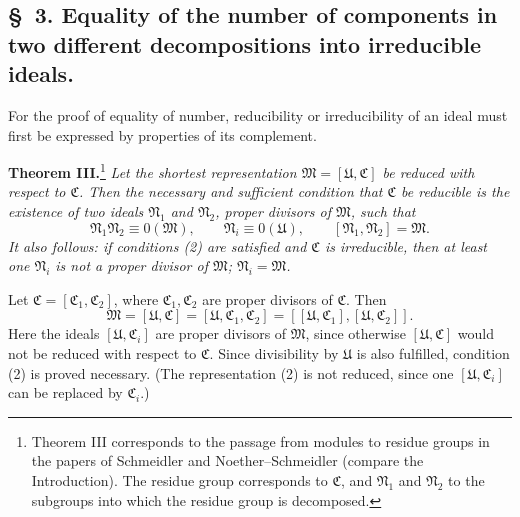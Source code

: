 \documentclass[11pt]{article}
\newcommand{\ideal}[1]{\mathfrak{#1}}
\begin{document}
\subsection*{\S~3. Equality of the number of components in two different decompositions into irreducible ideals.}

For the proof of equality of number, reducibility or irreducibility of an ideal must first be expressed by properties of its complement.

\textbf{Theorem III.}\footnote{Theorem III corresponds to the passage from modules to residue groups in the papers of Schmeidler and Noether--Schmeidler (compare the Introduction). The residue group corresponds to $\ideal C$, and $\ideal N_1$ and $\ideal N_2$ to the subgroups into which the residue group is decomposed.} \emph{Let the shortest representation $\ideal M=[\ideal U,\ideal C]$ be reduced with respect to $\ideal C$. Then the necessary and sufficient condition that $\ideal C$ be reducible is the existence of two ideals $\ideal N_1$ and $\ideal N_2$, proper divisors of $\ideal M$, such that}
\begin{equation}
 \ideal N_1\ideal N_2\equiv0(\ideal M),\qquad
 \ideal N_i\equiv0(\ideal U),\qquad
 [\ideal N_1,\ideal N_2]=\ideal M.
\tag{2}
\end{equation}
\emph{It also follows: if conditions (2) are satisfied and $\ideal C$ is irreducible, then at least one $\ideal N_i$ is not a proper divisor of $\ideal M$; $\ideal N_i=\ideal M$.}

Let $\ideal C=[\ideal C_1,\ideal C_2]$, where $\ideal C_1,\ideal C_2$ are proper divisors of $\ideal C$. Then
\[
 \ideal M=[\ideal U,\ideal C]=[\ideal U,\ideal C_1,\ideal C_2]
       =[[\ideal U,\ideal C_1],[\ideal U,\ideal C_2]].
\]
Here the ideals $[\ideal U,\ideal C_i]$ are proper divisors of $\ideal M$, since otherwise $[\ideal U,\ideal C]$ would not be reduced with respect to $\ideal C$. Since divisibility by $\ideal U$ is also fulfilled, condition (2) is proved necessary. (The representation (2) is not reduced, since one $[\ideal U,\ideal C_i]$ can be replaced by $\ideal C_i$.)
\end{document}
